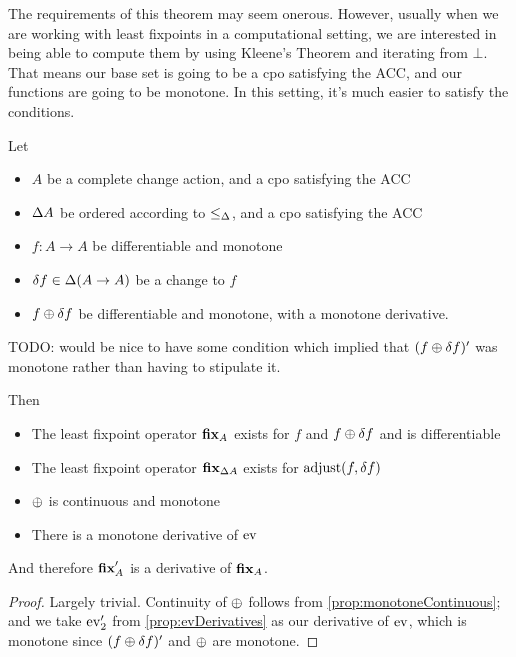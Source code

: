 The requirements of this theorem may seem onerous. However, usually when we are
working with least fixpoints in a computational setting, we are interested in
being able to compute them by using Kleene's Theorem and iterating from $\bot$.
That means our base set is going to be a cpo satisfying the ACC, and our
functions are going to be monotone. In this setting, it's much easier to satisfy
the conditions.

\begin{prop}
  Let
  \begin{itemize}
    \item $A$ be a complete change action, and a cpo satisfying the ACC
    \item $\Delta A$ be ordered according to $\leq_\Delta$, and a cpo
      satisfying the ACC
    \item $f: A \rightarrow A$ be differentiable and monotone
    \item $\delta f \in \Delta (A \rightarrow A)$ be a change to $f$
    \item$f \oplus \delta f$ be differentiable and monotone, with a monotone derivative.
  \end{itemize}

  TODO: would be nice to have some condition which implied that $(f
    \oplus \delta f)'$ was monotone rather than having to stipulate it.

  Then
  \begin{itemize}
    \item The least fixpoint operator $\textbf{fix}_A$ exists for $f$ and $f \oplus
      \delta f$ and is differentiable
    \item The least fixpoint operator $\textbf{fix}_{\Delta A}$ exists for
      $\operatorname{adjust}(f, \delta f)$
    \item $\oplus$ is continuous and monotone
    \item There is a monotone derivative of $\operatorname{ev}$
  \end{itemize}

  And therefore $\textbf{fix}_A'$ is a derivative of $\textbf{fix}_A$.
\end{prop}
\begin{proof}
  Largely trivial. Continuity of $\oplus$ follows from
  \cref{prop:monotoneContinuous}; and we take $\operatorname{ev}'_2$ from
  \cref{prop:evDerivatives} as our derivative of $\operatorname{ev}$, which is monotone 
  since $(f \oplus \delta f)'$ and $\oplus$ are monotone.
\end{proof}


